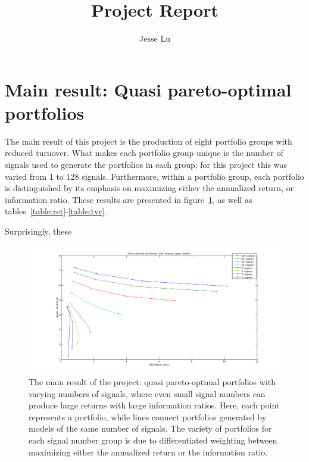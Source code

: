 \documentclass{article}
\title{Project Report}
\author{Jesse Lu}
\begin{document}
\maketitle
\tableofcontents

\section{Main result: Quasi pareto-optimal portfolios}

    The main result of this project is the production of 
        eight portfolio groups with reduced turnover.
    What makes each portfolio group unique is the number of signals
        used to generate the portfolios in each group;
        for this project this was varied from 1 to 128 signals.
    Furthermore, within a portfolio group, 
        each portfolio is distinguished by its emphasis on maximizing
        either the annualized return, or information ratio.
    These results are presented in figure~\ref{result},
        as well as tables~\ref{table:ret}-\ref{table:tvr}.

    Surprisingly, these 

    \begin{figure}[t]
        \centerline{\includegraphics[width=1.8\textwidth]{result.png}}
        \caption{The main result of the project: 
                quasi pareto-optimal portfolios with varying numbers of signals,
                where even small signal numbers can produce large returns
                with large information ratios.
            Here, each point represents a portfolio, 
                while lines connect portfolios 
                generated by models of the same number of signals.
            The variety of portfolios for each signal number group
                is due to differentiated weighting between maximizing
                either the annualized return or the information ratio.
            }
        \label{result}
    \end{figure}
    \clearpage
\end{document}
